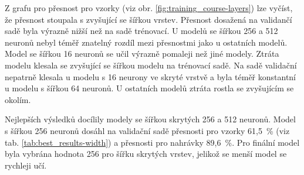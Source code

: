 \documentclass[FM,BP]{tulthesis}
\begin{document}
Z grafu pro přesnost pro vzorky (viz obr. \mbox{\ref{fig:training_course-layers}}) lze vyčíst, že přesnost stoupala s zvyšující se šířkou vrstev. Přesnost dosažená na validančí sadě byla výrazně nižší než na sadě trénovací. U modelů se šířkou 256 a 512 neuronů nebyl téměř znatelný rozdíl mezi přesnostmi jako u ostatních modelů. Model se šířkou 16 neuronů se učil výrazně pomaleji než jiné modely. Ztráta modelu klesala se zvyšující se šířkou modelu na trénovací sadě. Na sadě validační nepatrně klesala u modelu s 16 neurony ve skryté vrstvě a byla téměř konstantní u modelu s šířkou 64 neuronů. U ostatních modelů ztráta rostla se zvyšujícím se okolím.

Nejlepších výsledků docílily modely se šířkou skrytých 256 a 512 neuronů. Model s šířkou 256 neuronů dosáhl na validační sadě přesnosti pro vzorky \mbox{61,5 \%} (viz tab. \mbox{\ref{tab:best_results-width}}) a přesnosti pro nahrávky \mbox{89,6 \%}. Pro finální model byla vybrána hodnota 256 pro šířku skrytých vrstev, jelikož se menší model se rychleji učí.

\begin{table}[htb]
\centering
\caption{Přehled nejlepších výsledků při použití regularizace}
\label{tab:best_results-width}
\end{table}
\FloatBarrier
\end{document}
